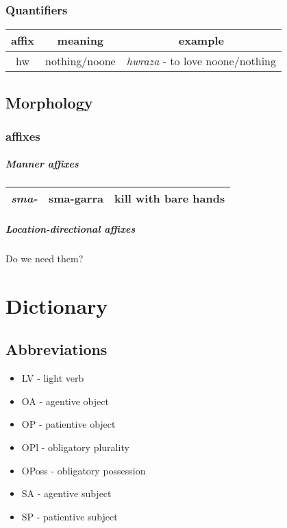 \documentclass[8pt]{book}
\begin{document}
\subsection{Quantifiers}

\begin{center}
\begin{tabular}{c | c | c}
affix & meaning & example \\ \hline
hw & nothing/noone & \textit{hwraza} - to love noone/nothing \\
\end{tabular}
\end{center}


\section{Morphology}
\subsection{affixes}
\paragraph{Manner affixes}
\begin{center}
\begin{tabular}{| c | c | c |}
  \hline
  \textit{sma-} & sma-garra & kill with bare hands \\ \hline
\end{tabular}
\end{center}

\paragraph{Location-directional affixes} Do we need them?

\chapter{Dictionary}

\section{Abbreviations}
\begin{itemize}
	\item LV - light verb
	\item OA - agentive object 
	\item OP - patientive object
	\item OPl - obligatory plurality
	\item OPoss - obligatory possession
	\item SA - agentive subject
	\item SP - patientive subject
\end{itemize}
\end{document}
